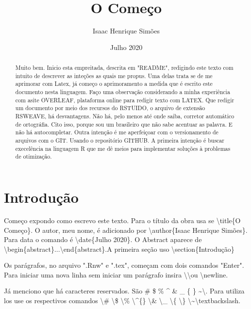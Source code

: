\documentclass[12pt,twoside]{article}
\title{O Começo}
\author{Isaac Henrique Simões}
\date{Julho 2020}
\begin{document}


  \maketitle

\begin{abstract}
Muito bem. Inicio esta empreitada, descrita em "README", redigindo este texto com intuito de descrever as inteções as quais me propus. Uma delas trata se de me aprimorar com Latex, já começo o aprimoramento a medida que é escrito este documento nesta linguagem. Faço uma observação considerando a minha experiência com asite OVERLEAF, plataforma online para redigir texto com LATEX. Que redigir um documento por meio dos recursos do RSTUIDO, o arquivo de extensão RSWEAVE, há desvantagens. Não há, pelo menos até onde saiba, corretor automático de ortográfia. Cito isso, porque sou um brasileiro que não sabe acentuar as palavra. E não há autocompletar. 
Outra intenção é me aperfeiçoar com o versionamento de arquivos com o GIT. Usando o repositório GITHUB. 
A primeira intenção é buscar execelência na linguagem R que me dê meios para implementar soluções à problemas de otimização.
\end{abstract}

\section{Introdução}

Começo expondo como escrevo este texto. Para o título da obra usa se \textbackslash{title}\{O Começo\}. O autor, meu nome, é adicionado por \textbackslash{author}\{Isaac Henrique Simões\}. Para data o comando é \textbackslash{date}\{Julho 2020\}. O Abstract aparece de \textbackslash{begin}\{abstract\}...\textbackslash{end}\{abstract\}.A primeira seção uso \textbackslash{section}\{Introdução\}

Os parágrafos, no arquivo ".Rnw" e ".tex", começam com dois comandos "Enter". Para iniciar uma nova linha sem iniciar um parágrafo insira \textbackslash \textbackslash  ou \textbackslash newline.

Já menciono que há caracteres reservados. São \# \$ \% \^{} \& \_ \{ \} \textasciitilde \textbackslash. Para utiliza los use os respectivos comandos \textbackslash\# \textbackslash\$ \textbackslash\% \textbackslash \^{}\{\} \textbackslash\& \textbackslash\_ \textbackslash\{ \textbackslash\} \textbackslash\textasciitilde \textbackslash textbackslash.
\end{document}

